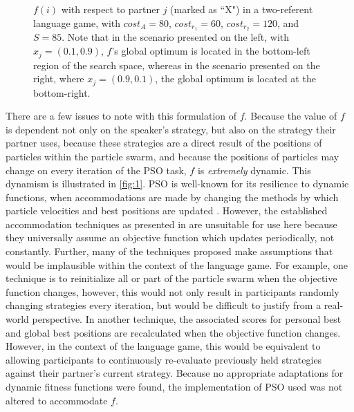 \documentclass[12pt,a4paper]{article}
\begin{document}
\begin{figure}
\centering
\scalebox{.725}{}
\caption{$f(i)$ with respect to partner $j$ (marked as ``X") in a two-referent language game, with $cost_A=80$, $cost_{r_1}=60$, $cost_{r_2}=120$, and $S=85$. Note that in the scenario presented on the left, with $x_j = (0.1, 0.9)$, $f$'s global optimum is located in the bottom-left region of the search space, whereas in the scenario presented on the right, where $x_j = (0.9, 0.1)$, the global optimum is located at the bottom-right.}
\label{fig:1}
\end{figure}

There are a few issues to note with this formulation of $f$. Because the value of $f$ is dependent not only on the speaker's strategy, but also on the strategy their partner uses, because these strategies are a direct result of the positions of particles within the particle swarm, and because the positions of particles may change on every iteration of the PSO task, $f$ is \textit{extremely} dynamic. This dynamism is illustrated in \autoref{fig:1}. PSO is well-known for its resilience to dynamic functions, when accommodations are made by changing the methods by which particle velocities and best positions are updated \citep{engelbrecht2005}. However, the established accommodation techniques as presented in \cite{engelbrecht2005} are unsuitable for use here because they universally assume an objective function which updates periodically, not constantly. Further, many of the techniques proposed make assumptions that would be implausible within the context of the \citeauthor{rohde2012} language game. For example, one technique is to reinitialize all or part of the particle swarm when the objective function changes, however, this would not only result in participants randomly changing strategies every iteration, but would be difficult to justify from a real-world perspective. In another technique, the associated scores for personal best and global best positions are recalculated when the objective function changes. However, in the context of the language game, this would be equivalent to allowing participants to continuously re-evaluate previously held strategies against their partner's current strategy. Because no appropriate adaptations for dynamic fitness functions were found, the implementation of PSO used was not altered to accommodate $f$.
\end{document}
